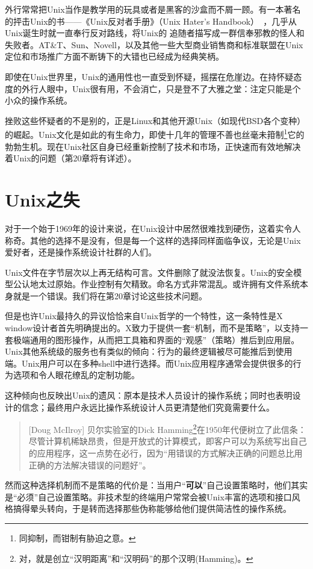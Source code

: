 \documentclass[12pt,oneside]{ctexbook}
\begin{document}
\begin{common-format}
外行常常把Unix当作是教学用的玩具或者是黑客的沙盒而不屑一顾。有一本著名的抨击Unix的书——《Unix反对者手册》（Unix Hater's Handbook）~\cite{Garfinkel}，几乎从Unix诞生时就一直奉行反对路线，将Unix的 追随者描写成一群信奉邪教的怪人和失败者。AT\&{}T、Sun、Novell，以及其他一些大型商业销售商和标准联盟在Unix定位和市场推广方面不断铸下的大错也已经成为经典笑柄。

即使在Unix世界里，Unix的通用性也一直受到怀疑，摇摆在危崖边。在持怀疑态度的外行人眼中，Unix很有用，不会消亡，只是登不了大雅之堂：注定只能是个小众的操作系统。

挫败这些怀疑者的不是别的，正是Linux和其他开源Unix（如现代BSD各个变种）的崛起。Unix文化是如此的有生命力，即使十几年的管理不善也丝毫未箝制\footnote{同抑制，而钳制有胁迫之意。}它的勃勃生机。现在Unix社区自身已经重新控制了技术和市场，正快速而有效地解决着Unix的问题（第20章将有详述）。


\section{Unix之失}
对于一个始于1969年的设计来说，在Unix设计中居然很难找到硬伤，这着实令人称奇。其他的选择不是没有，但是每一个这样的选择同样面临争议，无论是Unix爱好者，还是操作系统设计社群的人们。

Unix文件在字节层次以上再无结构可言。文件删除了就没法恢复。Unix的安全模型公认地太过原始。作业控制有欠精致。命名方式非常混乱。或许拥有文件系统本身就是一个错误。我们将在第20章讨论这些技术问题。

但是也许Unix最持久的异议恰恰来自Unix哲学的一个特性，这一条特性是X window设计者首先明确提出的。X致力于提供一套“机制，而不是策略”，以支持一套极端通用的图形操作，从而把工具箱和界面的“观感”（策略）推后到应用层。Unix其他系统级的服务也有类似的倾向：行为的最终逻辑被尽可能推后到使用端。Unix用户可以在多种shell中进行选择。而Unix应用程序通常会提供很多的行为选项和令人眼花缭乱的定制功能。

这种倾向也反映出Unix的遗风：原本是技术人员设计的操作系统；同时也表明设计的信念；最终用户永远比操作系统设计人员更清楚他们究竟需要什么。

\begin{quote}[Doug McIlroy]
贝尔实验室的Dick Hamming\footnote{对，就是创立“汉明距离”和“汉明码”的那个汉明(Hamming)。}在1950年代便树立了此信条：尽管计算机稀缺昂贵，但是开放式的计算模式，即客户可以为系统写出自己的应用程序，这一点势在必行，因为“用错误的方式解决正确的问题总比用正确的方法解决错误的问题好”。
\end{quote}

然而这种选择机制而不是策略的代价是：当用户“\textbf{可以}”自己设置策略时，他们其实是“必须”自己设置策略。非技术型的终端用户常常会被Unix丰富的选项和接口风格搞得晕头转向，于是转而选择那些伪称能够给他们提供简洁性的操作系统。


\end{common-format}
\end{document}
